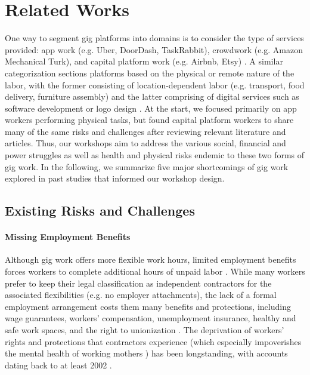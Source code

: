 \section{Related Works}
One way to segment gig platforms into domains is to consider the type of services provided: app work (e.g. Uber, DoorDash, TaskRabbit), crowdwork (e.g. Amazon Mechanical Turk), and capital platform work (e.g. Airbnb, Etsy) \cite{Duggan2020-qh}. A similar categorization sections platforms based on the physical or remote nature of the labor, with the former consisting of location-dependent labor (e.g. transport, food delivery, furniture assembly) and the latter comprising of digital services such as software development or logo design \cite{Huws2016-vv}. At the start, we focused primarily on app workers performing physical tasks, but found capital platform workers to share many of the same risks and challenges after reviewing relevant literature and articles. Thus, our workshops aim to address the various social, financial and power struggles as well as health and physical risks endemic to these two forms of gig work. In the following, we summarize five major shortcomings of gig work explored in past studies that informed our workshop design.


\subsection{Existing Risks and Challenges}\label{challenges}

\paragraph{Missing Employment Benefits} 
Although gig work offers more flexible work hours, limited employment benefits forces workers to complete additional hours of unpaid labor \cite{anwar2022faux}.
While many workers prefer to keep their legal classification as independent contractors for the associated flexibilities (e.g. no employer attachments), the lack of a formal employment arrangement costs them many benefits and protections, including wage guarantees, workers' compensation, unemployment insurance, healthy and safe work spaces, and the right to unionization \cite{Dubal2019-qi}. The deprivation of workers' rights and protections that contractors experience (which especially impoverishes the mental health of working mothers \cite{kirwin2022working}) has been longstanding, with accounts dating back to at least 2002 \cite{ilo2002resolution}.

